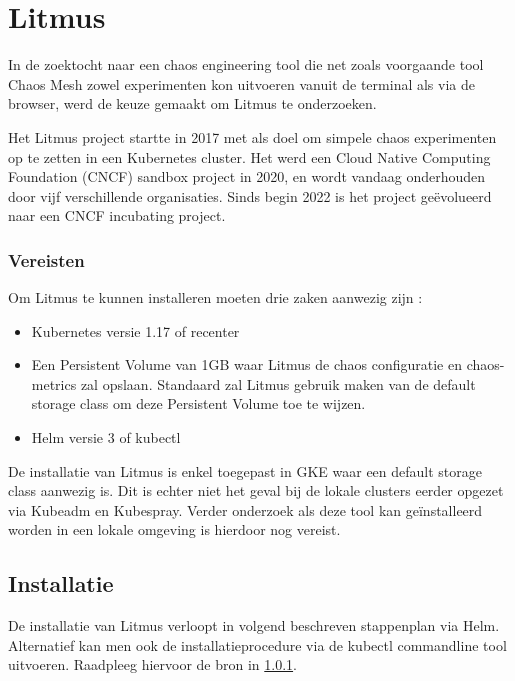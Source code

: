 \section{Litmus}

In de zoektocht naar een chaos engineering tool die net zoals voorgaande tool Chaos Mesh zowel experimenten kon uitvoeren vanuit de terminal als via de browser, werd de keuze gemaakt om Litmus te onderzoeken. 

Het Litmus project startte in 2017 met als doel om simpele chaos experimenten op te zetten in een Kubernetes cluster. Het werd een Cloud Native Computing Foundation (CNCF) sandbox project in 2020, en wordt vandaag onderhouden door vijf verschillende organisaties. Sinds begin 2022 is het project geëvolueerd naar een CNCF incubating project. \autocite{CNCF2022}

\subsubsection {Vereisten}
\label{sec:litmusvereisten}

Om Litmus te kunnen installeren moeten drie zaken aanwezig zijn \autocite{Litmus2022}: 
\begin{itemize}
    \item Kubernetes versie 1.17 of recenter
    \item Een Persistent Volume van 1GB waar Litmus de chaos configuratie en chaos-metrics zal opslaan. Standaard zal Litmus gebruik maken van de default storage class om deze Persistent Volume toe te wijzen.
    \item Helm versie 3 of kubectl 
\end{itemize}

De installatie van Litmus is enkel toegepast in GKE waar een default storage class aanwezig is. Dit is echter niet het geval bij de lokale clusters eerder opgezet via Kubeadm en Kubespray. Verder onderzoek als deze tool kan geïnstalleerd worden in een lokale omgeving is hierdoor nog vereist. 

\subsection{Installatie}

De installatie van Litmus verloopt in volgend beschreven stappenplan via Helm. Alternatief kan men ook de installatieprocedure via de kubectl commandline tool uitvoeren. Raadpleeg hiervoor de bron in \ref{sec:litmusvereisten}.   

